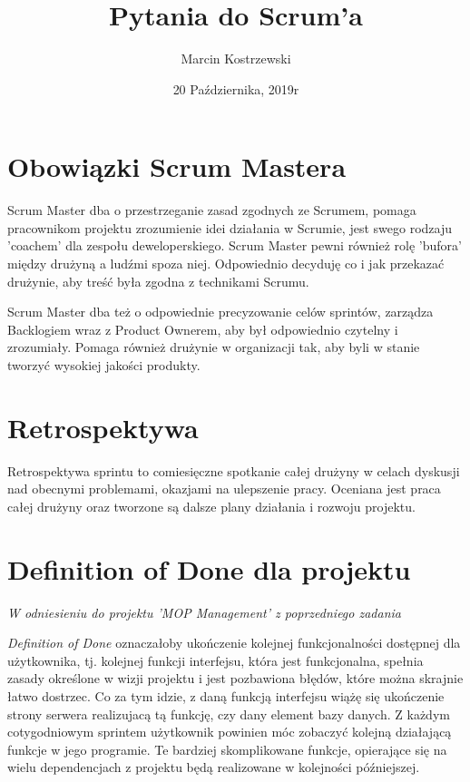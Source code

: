 \documentclass{article}
\title{Pytania do Scrum'a}
\author{Marcin Kostrzewski}
\date{20 Października, 2019r}
\begin{document}
\maketitle
\newpage

\section{Obowiązki Scrum Mastera}
Scrum Master dba o przestrzeganie zasad zgodnych ze Scrumem, pomaga pracownikom
projektu zrozumienie idei działania w Scrumie, jest swego rodzaju
'coachem' dla zespołu deweloperskiego. Scrum Master pewni również rolę
'bufora' między drużyną a ludźmi spoza niej. Odpowiednio decyduję
co i jak przekazać drużynie, aby treść była zgodna z technikami
Scrumu.
\par
Scrum Master dba też o odpowiednie precyzowanie celów sprintów,
zarządza Backlogiem wraz z Product Ownerem, aby był odpowiednio
czytelny i zrozumiały. Pomaga również drużynie w organizacji tak,
aby byli w stanie tworzyć wysokiej jakości produkty.

\section{Retrospektywa}
Retrospektywa sprintu to comiesięczne spotkanie całej drużyny w celach
dyskusji nad obecnymi problemami, okazjami na ulepszenie pracy. Oceniana
jest praca całej drużyny oraz tworzone są dalsze plany działania
i rozwoju projektu.

\section{Definition of Done dla projektu}
\begin{center}
    \textit{W odniesieniu do projektu 'MOP Management' z poprzedniego zadania}
\end{center}
\textit{Definition of Done} oznaczałoby ukończenie kolejnej funkcjonalności dostępnej
dla użytkownika, tj. kolejnej funkcji interfejsu, która jest funkcjonalna,
spełnia zasady określone w wizji projektu i jest pozbawiona błędów, które
można skrajnie łatwo dostrzec. Co za tym idzie, z daną funkcją interfejsu
wiążę się ukończenie strony serwera realizujacą tą funkcję, czy dany
element bazy danych. Z każdym cotygodniowym sprintem użytkownik powinien
móc zobaczyć kolejną działającą funkcje w jego programie. Te bardziej skomplikowane
funkcje, opierające się na wielu dependencjach z projektu będą realizowane
w kolejności późniejszej.
\end{document}
